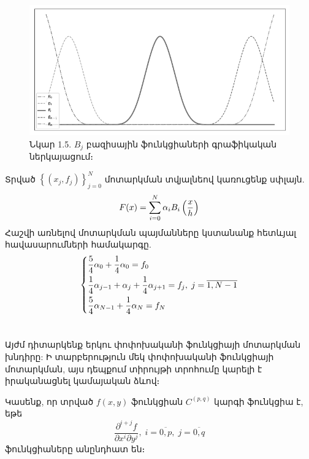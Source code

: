 \documentclass[fleqn, bachelor,subf,12pt,notitlepage]{article}
\begin{document}
\begin{figure}[H]
\centering
\includegraphics[width=1.0\textwidth]{images/all_cubic_compact_support_basis}
\captionsetup{labelformat=empty}
\caption{Նկար 1.5. $B_{j}$ բազիսային ֆունկցիաների գրաֆիկական ներկայացում։}
\end{figure}
Տրված $\left\{\left(x_{j}, f_{j}\right)\right\}_{j=0}^{N}$ մոտարկման տվյալնեով կառուցենք սփլայն.
\begin{equation}
F(x) = \sum_{i=0}^{N} \alpha_{i}B_{i}\left(\frac{x}{h}\right)$$
\end{equation}
Հաշվի առնելով մոտարկման պայմանները կստանանք հետևյալ հավասարումների համակարգը.
\begin{equation}
\begin{dcases}
\frac{5}{4}\alpha_{0} + \frac{1}{4}\alpha_{0} = f_{0}\\
\frac{1}{4}\alpha_{j-1} + \alpha_{j} + \frac{1}{4}\alpha_{j+1} = f_{j}, \; j=\overline{1, N-1}\\
\frac{5}{4}\alpha_{N-1} + \frac{1}{4}\alpha_{N} = f_{N}\\
\end{dcases}
\end{equation}
\newpage
\section*{}
\setcounter{equation}{0}
Այժմ դիտարկենք երկու փոփոխականի ֆունկցիայի մոտարկման խնդիրը: Ի տարբերություն մեկ փոփոխականի ֆունկցիայի մոտարկման, այս դեպքում տիրույթի տրոհումը կարելի է իրականացնել կամայական ձևով։

\vspace{1.5mm}

\noindent Կասենք, որ տրված $f\left(x, y\right)$ ֆունկցիան  $C^{\left(p, q\right)}$ կարգի ֆունկցիա է, եթե 
\begin{equation*}
\dfrac{\partial^{i+j} f}{\partial x^{i} \partial y^{j}}, \; i = \overline{0, p} , \; j = \overline{0, q}
\end{equation*}
ֆունկցիաները անընդհատ են։
\end{document}
